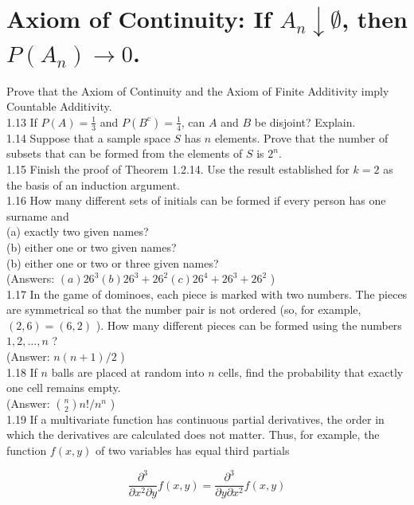 \documentclass[10pt]{article}
\begin{document}
\section*{Axiom of Continuity: If $A_{n} \downarrow \emptyset$, then $P\left(A_{n}\right) \rightarrow 0$.}
Prove that the Axiom of Continuity and the Axiom of Finite Additivity imply Countable Additivity.\\
1.13 If $P(A)=\frac{1}{3}$ and $P\left(B^{\mathrm{c}}\right)=\frac{1}{4}$, can $A$ and $B$ be disjoint? Explain.\\
1.14 Suppose that a sample space $S$ has $n$ elements. Prove that the number of subsets that can be formed from the elements of $S$ is $2^{n}$.\\
1.15 Finish the proof of Theorem 1.2.14. Use the result established for $k=2$ as the basis of an induction argument.\\
1.16 How many different sets of initials can be formed if every person has one surname and\\
(a) exactly two given names?\\
(b) either one or two given names?\\
(b) either one or two or three given names?\\
(Answers: $(a) 26^{3}(b) 26^{3}+26^{2}(c) 26^{4}+26^{3}+26^{2}$ )\\
1.17 In the game of dominoes, each piece is marked with two numbers. The pieces are symmetrical so that the number pair is not ordered (so, for example, $(2,6)=(6,2)$ ). How many different pieces can be formed using the numbers $1,2, \ldots, n$ ?\\
(Answer: $n(n+1) / 2$ )\\
1.18 If $n$ balls are placed at random into $n$ cells, find the probability that exactly one cell remains empty.\\
(Answer: $\binom{n}{2} n!/ n^{n}$ )\\
1.19 If a multivariate function has continuous partial derivatives, the order in which the derivatives are calculated does not matter. Thus, for example, the function $f(x, y)$ of two variables has equal third partials

$$
\frac{\partial^{3}}{\partial x^{2} \partial y} f(x, y)=\frac{\partial^{3}}{\partial y \partial x^{2}} f(x, y)
$$
\end{document}

